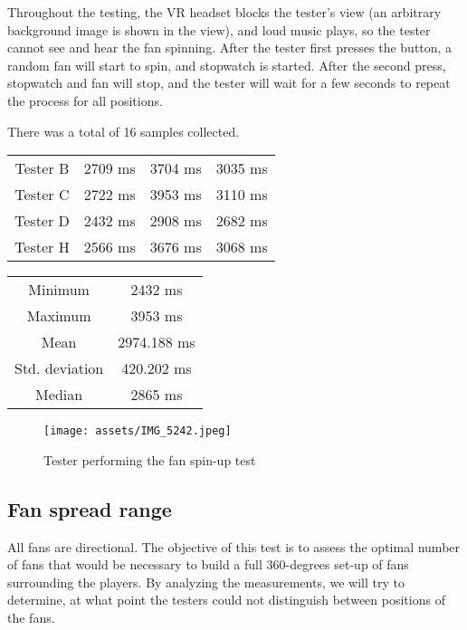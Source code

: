 Throughout the testing, the VR headset blocks the tester’s view (an arbitrary
background image is shown in the view), and loud music plays, so the tester
cannot see and hear the fan spinning. After the tester first presses the button,
a random fan will start to spin, and stopwatch is started. After the second
press, stopwatch and fan will stop, and the tester will wait for a few seconds
to repeat the process for all positions.


There was a total of 16 samples collected.


\begin{center}
\begin{tabular}{|c|c|c|c|}
\hline
Tester B & 2709 ms & 3704 ms & 3035 ms \\ 
Tester C & 2722 ms & 3953 ms & 3110 ms \\ 
Tester D & 2432 ms & 2908 ms & 2682 ms \\ 
Tester H & 2566 ms & 3676 ms & 3068 ms \\ 
\hline
\end{tabular}
\end{center}

\begin{center}
\begin{tabular}{|c|c|}
\hline
Minimum & 2432 ms \\ 
Maximum & 3953 ms \\ 
Mean & 2974.188 ms \\ 
Std. deviation & 420.202 ms \\ 
Median & 2865 ms \\ 
\hline
\end{tabular}
\end{center}

\begin{figure}[h]{}
\centering\texttt{[image: assets/IMG\_5242.jpeg]}
\caption{Tester performing the fan spin-up test}
\end{figure}

\hypertarget{x-fan-spread-range}{\subsection{Fan spread range}}
All fans are directional. The objective of this test is to assess
the optimal number of fans that would be necessary to build a full 360-degrees
set-up of fans surrounding the players. By analyzing the measurements,
we will try to determine, at what point the testers could not distinguish
between positions of the fans.


